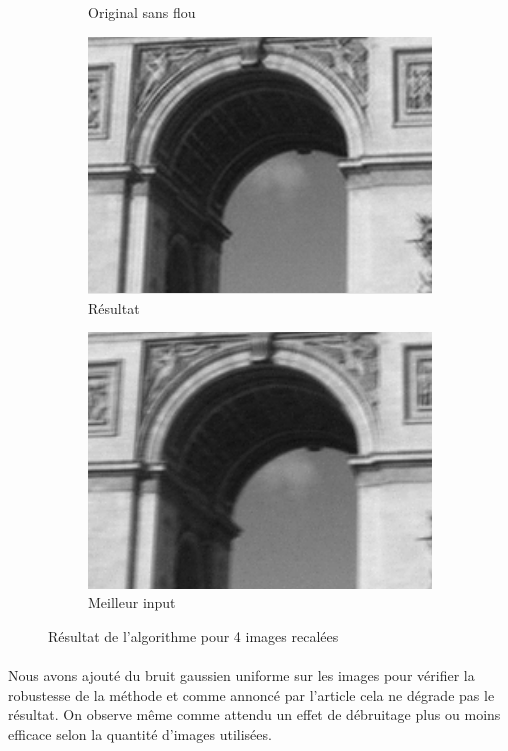 \documentclass[a4paper,10pt]{report}
\begin{document}
\begin{figure}[h]
\begin{subfigure}{0.32\textwidth}
\caption{Original sans flou}
\label{fig:Original}
\end{subfigure}
\begin{subfigure}{0.32\textwidth}
\includegraphics[width=0.9\linewidth]{ressource/detail_result.png}
\caption{Résultat}
\label{fig:Resultat}
\end{subfigure}
\begin{subfigure}{0.32\textwidth}
\includegraphics[width=0.9\linewidth]{ressource/detail_flou1.png} 
\caption{Meilleur input}
\label{fig:Bestflou}
\end{subfigure}

\caption{Résultat de l'algorithme pour 4 images recalées}
\label{fig:arctriomphe}
\end{figure}

\paragraph{}
Nous avons ajouté du bruit gaussien uniforme sur les images pour vérifier la robustesse de la méthode
et comme annoncé par l'article cela ne dégrade pas le résultat. On observe même comme attendu un effet
de débruitage plus ou moins efficace selon la quantité d'images utilisées.
\end{document}
